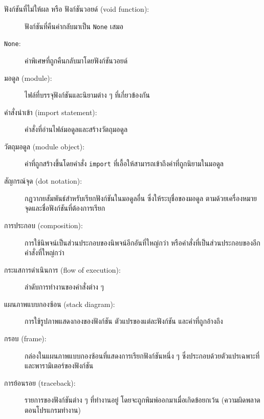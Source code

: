 \begin{description}
\item[ฟังก์ชันที่ไม่ให้ผล หรือ ฟังก์ชันวอยด์ (void function):] ฟังก์ชันที่คืนค่ากลับมาเป็น {\tt None} เสมอ

\item[{\tt None}:] ค่าพิเศษที่ถูกคืนกลับมาโดยฟังก์ชันวอยด์

\item[มอดูล (module):] ไฟล์ที่บรรจุฟังก์ชันและนิยามต่าง ๆ ที่เกี่ยวข้องกัน 

\item[คำสั่งนำเข้า (import statement):] คำสั่งที่อ่านไฟล์มอดูลและสร้างวัตถุมอดูล

\item[วัตถุมอดูล (module object):] ค่าที่ถูกสร้างขึ้นโดยคำสั่ง {\tt import} 
ที่เอื้อให้สามารถเข้าถึงค่าที่ถูกนิยามในมอดูล

\item[สัญกรณ์จุด (dot notation):]  กฎวากยสัมพันธ์สำหรับเรียกฟังก์ชันในมอดูลอื่น ซึ่งให้ระบุชื่อของมอดูล
ตามด้วยเครื่องหมายจุดและชื่อฟังก์ชันที่ต้องการเรียก 

\item[การประกอบ (composition):] การใช้นิพจน์เป็นส่วนประกอบของนิพจน์อีกอันที่ใหญ่กว่า 
หรือคำสั่งที่เป็นส่วนประกอบของอีกคำสั่งที่ใหญ่กว่า

\item[กระแสการดำเนินการ (flow of execution):]  ลำดับการทำงานของคำสั่งต่าง ๆ

\item[แผนภาพแบบกองซ้อน (stack diagram):]  การใช้รูปภาพแสดงกองของฟังก์ชัน ตัวแปรของแต่ละฟังก์ชัน 
และค่าที่ถูกอ้างถึง

\item[กรอบ (frame):]  กล่องในแผนภาพแบบกองซ้อนที่แสดงการเรียกฟังก์ชันหนึ่ง ๆ ซึ่งประกอบด้วยตัวแปรเฉพาะที่
และพารามิเตอร์ของฟังก์ชัน

\item[การย้อนรอย (traceback):]  รายการของฟังก์ชันต่าง ๆ ที่ทำงานอยู่ โดยจะถูกพิมพ์ออกมาเมื่อเกิดข้อยกเว้น
(ความผิดพลาดตอนโปรแกรมทำงาน)


\end{description}


